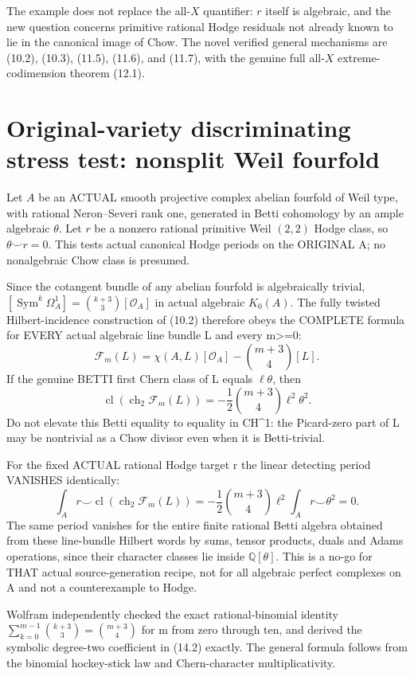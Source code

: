 \documentclass[11pt]{article}
\newcommand{\Q}{\mathbb Q}
\newcommand{\ch}{\operatorname{ch}}
\newcommand{\cl}{\operatorname{cl}}
\begin{document}
The example does not replace the all-\(X\) quantifier:
\(r\) itself is algebraic, and the new question concerns
primitive rational Hodge residuals not already known to lie
in the canonical image of Chow.
The novel verified general mechanisms are (10.2), (10.3),
(11.5), (11.6), and (11.7), with the genuine full all-\(X\)
extreme-codimension theorem (12.1).

\section{Original-variety discriminating stress test: nonsplit Weil fourfold}
Let \(A\) be an ACTUAL smooth projective complex
abelian fourfold of Weil type, with rational
Neron--Severi rank one, generated in Betti
cohomology by an ample algebraic \(\theta\).
Let \(r\) be a nonzero rational primitive
Weil \((2,2)\) Hodge class, so
\(\theta\smile r=0\).
This tests actual canonical Hodge
periods on the ORIGINAL A; no
nonalgebraic Chow class is presumed.

Since the cotangent bundle of any abelian
fourfold is algebraically trivial,
\(
 [\operatorname{Sym}^k\Omega_A^1]
  =\binom{k+3}{3}[\mathcal O_A]
\)
in actual algebraic \(K_0(A)\).
The fully twisted Hilbert-incidence
construction of (10.2) therefore obeys
the COMPLETE formula for EVERY actual
algebraic line bundle L and every m>=0:
\[
 \boxed{\mathcal F_m(L)
  =\chi(A,L)[\mathcal O_A]
          -\binom{m+3}{4}[L].}                    \tag{14.1}
\]
If the genuine BETTI first Chern class
of L equals \(\ell\theta\), then
\[
 \boxed{\cl(\ch_2\mathcal F_m(L))
  =-\frac12\binom{m+3}{4}\ell^2\theta^2.}          \tag{14.2}
\]
Do not elevate this Betti equality
to equality in CH^1: the Picard-zero
part of L may be nontrivial as a Chow
divisor even when it is Betti-trivial.

For the fixed ACTUAL rational Hodge
target r the linear detecting
period VANISHES identically:
\[
 \boxed{\int_A r\smile
            \cl(\ch_2\mathcal F_m(L))
     =-\frac12\binom{m+3}{4}\ell^2
           \int_A r\smile\theta^2=0.}             \tag{14.3}
\]
The same period vanishes for the
entire finite rational Betti algebra
obtained from these line-bundle
Hilbert words by sums, tensor
products, duals and Adams operations,
since their character classes lie
inside \(\Q[\theta]\).
This is a no-go for THAT actual
source-generation recipe, not for
all algebraic perfect complexes on A
and not a counterexample to Hodge.

Wolfram independently checked the
exact rational-binomial identity
\(
 \sum_{k=0}^{m-1}\binom{k+3}{3}
        =\binom{m+3}{4}
\)
for m from zero through ten,
and derived the symbolic degree-two
coefficient in (14.2) exactly.
The general formula follows
from the binomial hockey-stick law
and Chern-character multiplicativity.
\end{document}
